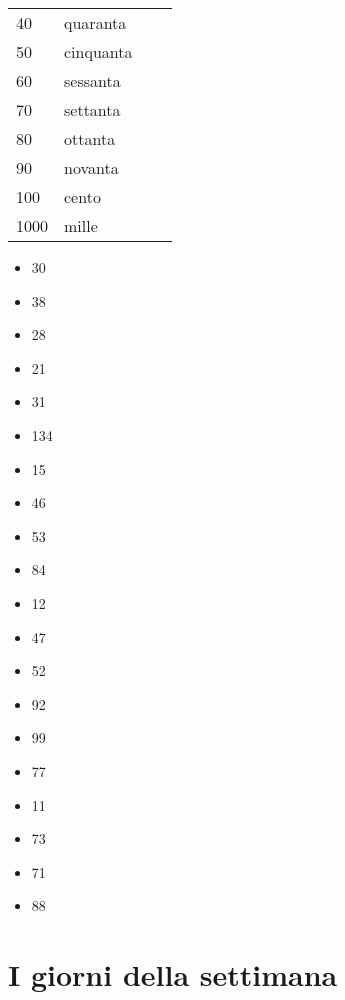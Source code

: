\documentclass[letter,11pt]{article}
\begin{document}
\begin{multicols}{4}
    \begin{tabular}{ |p{0.6cm}| p{2cm}| p{0.5cm}| p{3cm}| }

    \hline
    \hline

     &   \\ \hline
    40 & quaranta \\ \hline
    50 & cinquanta  \\ \hline
    60 & sessanta \\ \hline
    70 & settanta \\ \hline
    80 & ottanta \\ \hline
    90 & novanta \\ \hline
    100 & cento \\ \hline
    1000 & mille \\ \hline

    \hline
    \end{tabular}

    \end{multicols}

\vskip 0.2in
\begin{multicols}{4}
\begin{itemize}
    \item 30
    \item 38
    \item 28
    \item 21
    \item 31
    \item 134
    \item 15
    \item 46
    \item 53
    \item 84
    \item 12
    \item 47
    \item 52
    \item 92
    \item 99
    \item 77
    \item 11
    \item 73
    \item 71
    \item 88

\end{itemize}
\end{multicols}

\vskip 0.2in
\section*{I giorni della settimana}
\vskip 0.2in
\end{document}
